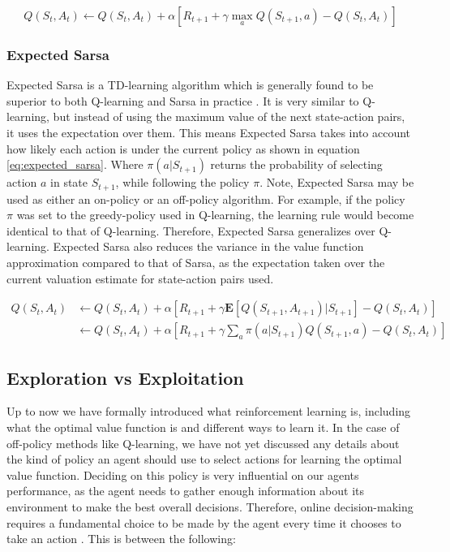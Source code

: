 \documentclass[../dissertation.tex]{subfiles}
\begin{document}
\begin{equation}
Q(S_t, A_t) \leftarrow Q(S_t, A_t) + \alpha[R_{t+1} + \gamma \max_aQ(S_{t+1}, a) - Q(S_t, A_t)]
\end{equation}

\subsubsection{Expected Sarsa}

Expected Sarsa is a TD-learning algorithm which is generally found to be superior to both Q-learning and Sarsa in practice \cite{sutton2011reinforcement}. It is very similar to Q-learning, but instead of using the maximum value of the next state-action pairs, it uses the expectation over them. This means Expected Sarsa takes into account how likely each action is under the current policy as shown in equation \ref{eq:expected_sarsa}. Where $\pi(a | S_{t+1})$ returns the probability of selecting action $a$ in state $S_{t+1}$, while following the policy $\pi$. Note, Expected Sarsa may be used as either an on-policy or an off-policy algorithm. For example, if the policy $\pi$ was set to the greedy-policy used in Q-learning, the learning rule would become identical to that of Q-learning. Therefore, Expected Sarsa generalizes over Q-learning. Expected Sarsa also reduces the variance in the value function approximation compared to that of Sarsa, as the expectation taken over the current valuation estimate for state-action pairs used.

\begin{align}
Q(S_t, A_t) &  \leftarrow Q(S_t, A_t) + \alpha [R_{t+1} + \gamma \mathbf{E}[Q(S_{t+1}, A_{t+1}) | S_{t+1}] - Q(S_t, A_t)] \nonumber \\
 & \leftarrow Q(S_t, A_t) + \alpha [R_{t+1} + \gamma \sum_a \pi(a| S_{t+1}) Q(S_{t+1}, a) - Q(S_t, A_t)]
 \label{eq:expected_sarsa}
\end{align}

\subsection{Exploration vs Exploitation}
\label{sec:exploration_vs_exploitation}

Up to now we have formally introduced what reinforcement learning is, including what the optimal value function is and different ways to learn it. In the case of off-policy methods like Q-learning, we have not yet discussed any details about the kind of policy an agent should use to select actions for learning the optimal value function. Deciding on this policy is very influential on our agents performance, as the agent needs to gather enough information about its environment to make the best overall decisions. Therefore, online decision-making requires a fundamental choice to be made by the agent every time it chooses to take an action \cite{exploration_vs_exploitation}. This is between the following:
\end{document}
